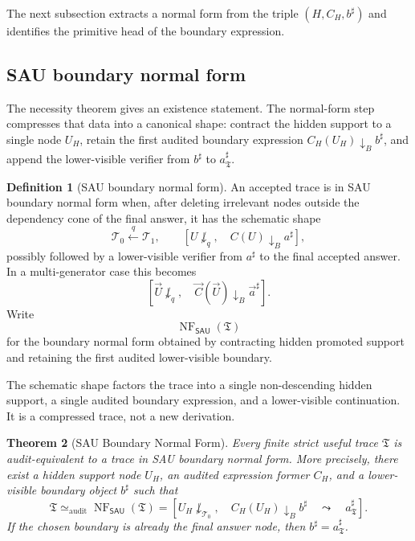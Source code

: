 \documentclass[11pt]{article}
\newcommand{\SAU}{\mathsf{SAU}}
\newcommand{\NF}{\operatorname{NF}}
\newtheorem{theorem}{Theorem}[section]
\theoremstyle{definition}
\newtheorem{definition}[theorem]{Definition}
\begin{document}
The next subsection extracts a normal form from the triple
\((H,C_H,b^\sharp)\) and identifies the primitive head of the boundary
expression.

\subsection{SAU boundary normal form}
\label{subsec:necessity-boundary-normal-form}

The necessity theorem gives an existence statement.  The normal-form step
compresses that data into a canonical shape: contract the hidden support to a
single node \(U_H\), retain the first audited boundary expression
\(C_H(U_H)\downarrow_B b^\sharp\), and append the lower-visible verifier from
\(b^\sharp\) to \(a^\sharp_{\mathfrak T}\).

\begin{definition}[SAU boundary normal form]
\label{def:sau-boundary-normal-form}
An accepted trace is in SAU boundary normal form when, after deleting irrelevant nodes outside the dependency cone of the final answer, it has the schematic shape
\[
\mathcal T_0
\xleftarrow{\ q\ }
\mathcal T_1,
\qquad
\left[U\not\downarrow_q,
\quad
C(U)\downarrow_B a^\sharp\right],
\]
possibly followed by a lower-visible verifier from \(a^\sharp\) to the final accepted answer.  In a multi-generator case this becomes
\[
\left[\vec U\not\downarrow_q,
\quad
\vec C(\vec U)\downarrow_B \vec a^\sharp\right].
\]
Write
\[
\NF_{\SAU}(\mathfrak T)
\]
for the boundary normal form obtained by contracting hidden promoted support and retaining the first audited lower-visible boundary.
\end{definition}

The schematic shape factors the trace into a single non-descending hidden
support, a single audited boundary expression, and a lower-visible continuation.
It is a compressed trace, not a new derivation.

\begin{theorem}[SAU Boundary Normal Form]
\label{thm:sau-boundary-normal-form}
Every finite strict useful trace \(\mathfrak T\) is audit-equivalent to a trace in SAU boundary normal form.  More precisely, there exist a hidden support node \(U_H\), an audited expression former \(C_H\), and a lower-visible boundary object \(b^\sharp\) such that
\[
\mathfrak T\simeq_{\mathrm{audit}}
\NF_{\SAU}(\mathfrak T)
=
\left[U_H\not\downarrow_{\mathcal T_0},
\quad
C_H(U_H)\downarrow_B b^\sharp
\quad\leadsto\quad
 a^\sharp_{\mathfrak T}\right].
\]
If the chosen boundary is already the final answer node, then \(b^\sharp=a^\sharp_{\mathfrak T}\).
\end{theorem}
\end{document}
